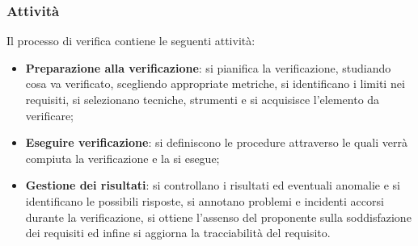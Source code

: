 	\subsubsection{Attività}
	Il processo di verifica contiene le seguenti attività:
	\begin{itemize}
	    \item \textbf{Preparazione alla verificazione}: si pianifica la verificazione, studiando cosa va verificato, scegliendo appropriate metriche, si identificano i limiti nei requisiti, si selezionano tecniche, strumenti e si acquisisce l'elemento da verificare;
	    \item \textbf{Eseguire verificazione}: si definiscono le procedure attraverso le quali verrà compiuta la verificazione e la si esegue;
	    \item \textbf{Gestione dei risultati}: si controllano i risultati ed eventuali anomalie e si identificano le possibili risposte, si annotano problemi e incidenti accorsi durante la verificazione, si ottiene l'assenso del proponente sulla soddisfazione dei requisiti ed infine si aggiorna la tracciabilità del requisito.
	\end{itemize}
